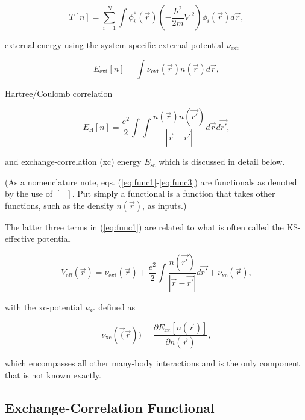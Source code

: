     \begin{equation}
    \label{eq:func2}
        T[n] = \sum\limits_{i=1}^N \int \phi_i^*(\Vec{r})\left(-\frac{\hbar^2}{2m}\nabla^2 \right)\phi_i(\Vec{r})d\Vec{r},
    \end{equation}
    
    \noindent external energy using the system-specific external potential $\nu_\text{ext}$
    
    \begin{equation}
        E_\text{ext}[n] = \int \nu_\text{ext}(\Vec{r}) n(\Vec{r})d\Vec{r},
    \end{equation}
    
    \noindent Hartree/Coulomb correlation 
    
    \begin{equation}
    \label{eq:func3}
        E_\text{H}[n] = \frac{e^2}{2}\int\int \frac{n(\Vec{r})n(\Vec{r'})}{|\Vec{r} - \Vec{r'}|}d\Vec{r}d\Vec{r'}, 
    \end{equation}
    
    \noindent and exchange-correlation (xc) energy $E_\text{sc}$ which is discussed in detail below. 
    
    (As a nomenclature note, eqs. (\ref{eq:func1}-\ref{eq:func3}) are functionals as denoted by the use of $[\text{ }]$. Put simply a functional is a function that takes other functions, such as the density $n(\Vec{r})$, as inputs.)
    
    The latter three terms in (\ref{eq:func1}) are related to what is often called the KS-effective potential
    
    \begin{equation}
        V_\text{eff}(\Vec{r}) = \nu_\text{ext}(\Vec{r}) + \frac{e^2}{2}\int \frac{n(\Vec{r'})}{|\Vec{r}- \Vec{r'}|} d\Vec{r'} + \nu_\text{xc}(\Vec{r}),
    \end{equation}
    
    \noindent with the xc-potential $\nu_\text{xc}$ defined as
    
    \begin{equation}
        \nu_\text{xc}(\vec(\vec{r})) = \frac{\partial E_{xc}[n(\vec{r})]}{\partial n(\vec{r})},
    \end{equation}
    
    \noident which encompasses all other many-body interactions and is the only component that is not known exactly.
    
    \subsection{Exchange-Correlation Functional}
    
